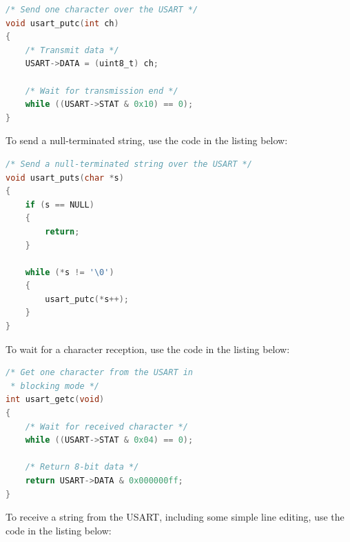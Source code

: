 \documentclass[12pt]{article}
\begin{document}
\begin{lstlisting}[language=C]
/* Send one character over the USART */
void usart_putc(int ch)
{
    /* Transmit data */
    USART->DATA = (uint8_t) ch;
            
    /* Wait for transmission end */
    while ((USART->STAT & 0x10) == 0);
}
\end{lstlisting}

To send a null-terminated string, use the code in the listing below:

\begin{lstlisting}[language=C]
/* Send a null-terminated string over the USART */
void usart_puts(char *s)
{
    if (s == NULL)
    {
        return;
    }

    while (*s != '\0')
    {
        usart_putc(*s++);
    }
}
\end{lstlisting}

To wait for a character reception, use the code in the listing below:

\begin{lstlisting}[language=C]
/* Get one character from the USART in
 * blocking mode */
int usart_getc(void)
{
    /* Wait for received character */
    while ((USART->STAT & 0x04) == 0);

    /* Return 8-bit data */
    return USART->DATA & 0x000000ff;
}
\end{lstlisting}

To receive a string from the USART, including some simple line editing, use the code in the listing below:
\end{document}
